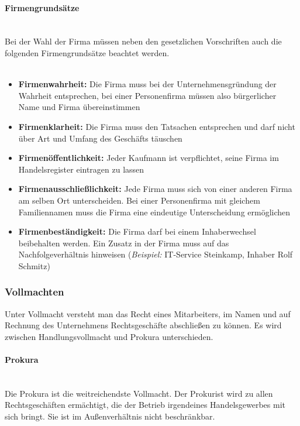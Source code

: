 \paragraph{Firmengrundsätze}~\\
Bei der Wahl der Firma müssen neben den gesetzlichen Vorschriften auch die folgenden Firmengrundsätze beachtet werden.\\
\\
\begin{itemize}
	\item {\bf Firmenwahrheit:} Die Firma muss bei der Unternehmensgründung der Wahrheit entsprechen, bei einer Personenfirma müssen also bürgerlicher Name und Firma übereinstimmen
	\item {\bf Firmenklarheit:} Die Firma muss den Tatsachen entsprechen und darf nicht über Art und Umfang des Geschäfts täuschen
	\item {\bf Firmenöffentlichkeit:} Jeder Kaufmann ist verpflichtet, seine Firma im Handelsregister eintragen zu lassen
	\item {\bf Firmenausschließlichkeit:} Jede Firma muss sich von einer anderen Firma am selben Ort unterscheiden. Bei einer Personenfirma mit gleichem Familiennamen muss die Firma eine eindeutige Unterscheidung ermöglichen
	\item {\bf Firmenbeständigkeit:} Die Firma darf bei einem Inhaberwechsel beibehalten werden. Ein Zusatz in der Firma muss auf das Nachfolgeverhältnis hinweisen ({\it Beispiel:} IT-Service Steinkamp, Inhaber Rolf Schmitz)
\end{itemize}

\subsubsection{Vollmachten}
	Unter Vollmacht versteht man das Recht eines Mitarbeiters, im Namen und auf Rechnung des Unternehmens Rechtsgeschäfte abschließen zu können. Es wird zwischen Handlungsvollmacht und Prokura unterschieden.
	
	\paragraph{Prokura}~\\
	Die Prokura ist die weitreichendste Vollmacht. Der Prokurist wird zu allen Rechtsgeschäften ermächtigt, die der Betrieb irgendeines Handelsgewerbes mit sich bringt. Sie ist im Außenverhältnis nicht beschränkbar.
	
